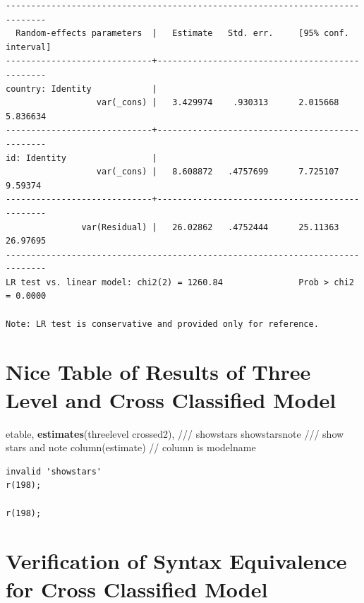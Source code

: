 \documentclass[
  letterpaper,
  DIV=11,
  numbers=noendperiod]{scrreprt}
\newenvironment{Shaded}{\begin{snugshade}}{\end{snugshade}}
\newcommand{\CommentTok}[1]{\textcolor[rgb]{0.37,0.37,0.37}{#1}}
\newcommand{\KeywordTok}[1]{\textcolor[rgb]{0.00,0.23,0.31}{\textbf{#1}}}
\newcommand{\NormalTok}[1]{\textcolor[rgb]{0.00,0.23,0.31}{#1}}
\begin{document}
\begin{verbatim}
------------------------------------------------------------------------------
  Random-effects parameters  |   Estimate   Std. err.     [95% conf. interval]
-----------------------------+------------------------------------------------
country: Identity            |
                  var(_cons) |   3.429974    .930313      2.015668    5.836634
-----------------------------+------------------------------------------------
id: Identity                 |
                  var(_cons) |   8.608872   .4757699      7.725107     9.59374
-----------------------------+------------------------------------------------
               var(Residual) |   26.02862   .4752444      25.11363    26.97695
------------------------------------------------------------------------------
LR test vs. linear model: chi2(2) = 1260.84               Prob > chi2 = 0.0000

Note: LR test is conservative and provided only for reference.
\end{verbatim}

\section{Nice Table of Results of Three Level and Cross Classified
Model}\label{nice-table-of-results-of-three-level-and-cross-classified-model}

\begin{Shaded}
\begin{Highlighting}[]

\NormalTok{etable, }\KeywordTok{estimates}\NormalTok{(threelevel crossed2), }\CommentTok{///}
\NormalTok{showstars showstarsnote }\CommentTok{/// show stars and note}
\NormalTok{column(estimate) }\CommentTok{// column is modelname}
\end{Highlighting}
\end{Shaded}

\begin{verbatim}
invalid 'showstars' 
r(198);

r(198);
\end{verbatim}

\section{Verification of Syntax Equivalence for Cross Classified
Model}\label{verification-of-syntax-equivalence-for-cross-classified-model}
\end{document}
